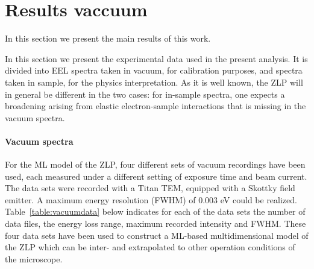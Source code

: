 \section{Results vaccuum}
\label{sec:results_vaccum}

In this section we present the main results of this work.

In this section we present the experimental data used
in the present analysis.
%
It is divided into EEL spectra taken in vacuum, for calibration
purposes, and spectra taken in sample, for the physics interpretation.
%
As it is well known, the ZLP will in general be different
in the two cases: for in-sample spectra, one expects a broadening
arising from elastic electron-sample interactions that is missing in
the vacuum spectra.

\paragraph{Vacuum spectra}
%
For the ML model of the ZLP, four different sets of vacuum recordings
have been used, each measured under a different setting of exposure time 
and beam current. 
%
The data sets were recorded with a Titan TEM, equipped with a Skottky field emitter.
A maximum energy resolution (FWHM) of 0.003 eV could be realized. 
%
Table~\ref{table:vacuumdata} below indicates for each of the data sets the number of data files, 
the energy loss range, maximum recorded intensity and FWHM. 
%
These four data sets have been used to construct a ML-based
multidimensional model of the ZLP which can be inter- and extrapolated
to other operation conditions of the microscope.



